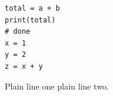 \documentclass[11pt,a4paper]{article}
\begin{document}
\begin{verbatim}
total = a + b
print(total)
# done
x = 1
y = 2
z = x + y
\end{verbatim}

Plain line one
plain line two.
\end{document}
